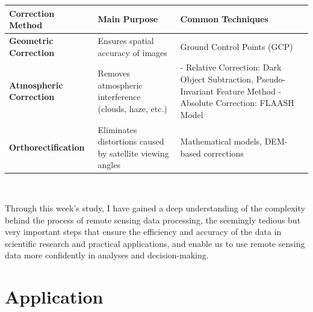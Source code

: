 \documentclass[
  letterpaper,
  DIV=11,
  numbers=noendperiod]{scrreprt}
\begin{document}
\begin{longtable}[]{@{}
  >{\raggedright\arraybackslash}p{}
  >{\raggedright\arraybackslash}p{}
  >{\raggedright\arraybackslash}p{}@{}}
\toprule\noalign{}
\begin{minipage}[b]{\linewidth}\raggedright
\textbf{Correction Method}
\end{minipage} & \begin{minipage}[b]{\linewidth}\raggedright
\textbf{Main Purpose}
\end{minipage} & \begin{minipage}[b]{\linewidth}\raggedright
\textbf{Common Techniques}
\end{minipage} \\
\midrule\noalign{}
\endhead
\bottomrule\noalign{}
\endlastfoot
\textbf{Geometric Correction} & Ensures spatial accuracy of images &
Ground Control Points (GCP) \\
\textbf{Atmospheric Correction} & Removes atmospheric interference
(clouds, haze, etc.) & - Relative Correction: Dark Object Subtraction,
Pseudo-Invariant Feature Method - Absolute Correction: FLAASH Model \\
\textbf{Orthorectification} & Eliminates distortions caused by satellite
viewing angles & Mathematical models, DEM-based corrections \\
\end{longtable}

\begin{verbatim}
                
\end{verbatim}

Through this week's study, I have gained a deep understanding of the
complexity behind the process of remote sensing data processing, the
seemingly tedious but very important steps that ensure the efficiency
and accuracy of the data in scientific research and practical
applications, and enable us to use remote sensing data more confidently
in analyses and decision-making.

\section{Application}\label{application}
\end{document}
